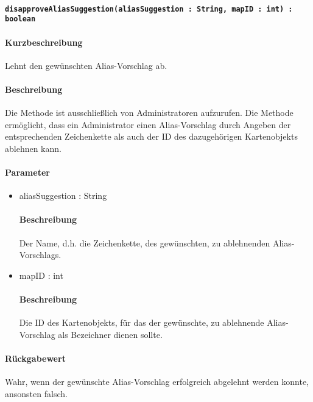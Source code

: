 \paragraph{\texttt{disapproveAliasSuggestion(aliasSuggestion : String, mapID : int) : boolean}}%
\paragraph*{Kurzbeschreibung}
Lehnt den gewünschten Alias-Vorschlag ab.
\paragraph*{Beschreibung}
Die Methode ist ausschließlich von Administratoren aufzurufen.
Die Methode ermöglicht, dass ein Administrator einen Alias-Vorschlag durch Angeben der entsprechenden Zeichenkette als auch der ID des dazugehörigen Kartenobjekts ablehnen kann.
\paragraph*{Parameter}
\begin{itemize}
	\item aliasSuggestion : String
		\paragraph*{Beschreibung}
		Der Name, d.h. die Zeichenkette, des gewünschten, zu ablehnenden Alias-Vorschlags.
	\item mapID : int
		\paragraph*{Beschreibung}
		Die ID des Kartenobjekts, für das der gewünschte, zu ablehnende Alias-Vorschlag als Bezeichner dienen sollte.
\end{itemize}
\paragraph*{Rückgabewert}
Wahr, wenn der gewünschte Alias-Vorschlag erfolgreich abgelehnt werden konnte, ansonsten falsch.
